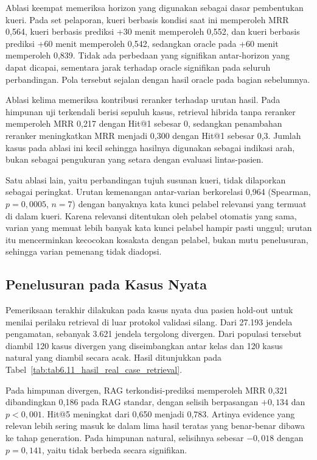Ablasi keempat memeriksa horizon yang digunakan sebagai dasar pembentukan kueri. Pada set pelaporan, kueri berbasis kondisi saat ini memperoleh MRR 0,564, kueri
berbasis prediksi +30 menit memperoleh 0,552, dan kueri berbasis prediksi +60 menit memperoleh 0,542, sedangkan oracle pada +60 menit memperoleh 0,839. Tidak ada
perbedaan yang signifikan antar-horizon yang dapat dicapai, sementara jarak terhadap oracle signifikan pada seluruh perbandingan. Pola tersebut sejalan dengan
hasil oracle pada bagian sebelumnya.

Ablasi kelima memeriksa kontribusi reranker terhadap urutan hasil. Pada himpunan uji terkendali berisi sepuluh kasus, retrieval hibrida tanpa reranker memperoleh
MRR 0,217 dengan Hit@1 sebesar 0, sedangkan penambahan reranker meningkatkan MRR menjadi 0,300 dengan Hit@1 sebesar 0,3. Jumlah kasus pada ablasi ini kecil
sehingga hasilnya digunakan sebagai indikasi arah, bukan sebagai pengukuran yang setara dengan evaluasi lintas-pasien.

Satu ablasi lain, yaitu perbandingan tujuh susunan kueri, tidak dilaporkan sebagai peringkat. Urutan kemenangan antar-varian berkorelasi 0,964 (Spearman,
$p=0,0005$, $n=7$) dengan banyaknya kata kunci pelabel relevansi yang termuat di dalam kueri. Karena relevansi ditentukan oleh pelabel otomatis yang sama,
varian yang memuat lebih banyak kata kunci pelabel hampir pasti unggul; urutan itu mencerminkan kecocokan kosakata dengan pelabel, bukan mutu penelusuran,
sehingga varian pemenang tidak diadopsi.

\subsection{Penelusuran pada Kasus Nyata}
\label{subsec:bab6-real-case-retrieval}

Pemeriksaan terakhir dilakukan pada kasus nyata dua pasien hold-out untuk menilai perilaku retrieval di luar protokol validasi silang. Dari 27.193 jendela
pengamatan, sebanyak 3.621 jendela tergolong divergen. Dari populasi tersebut diambil 120 kasus divergen yang diseimbangkan antar kelas dan 120 kasus natural
yang diambil secara acak. Hasil ditunjukkan pada Tabel~\ref{tab:tab6.11_hasil_real_case_retrieval}.



Pada himpunan divergen, RAG terkondisi-prediksi memperoleh MRR 0,321 dibandingkan 0,186 pada RAG standar, dengan selisih berpasangan $+0,134$ dan
$p<0,001$. Hit@5 meningkat dari 0,650 menjadi 0,783. Artinya evidence yang relevan lebih sering masuk ke dalam lima hasil teratas yang benar-benar dibawa ke
tahap generation. Pada himpunan natural, selisihnya sebesar $-0,018$ dengan $p=0,141$, yaitu tidak berbeda secara signifikan.

